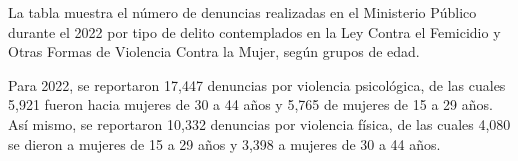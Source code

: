 \justifying La tabla muestra el número de denuncias realizadas en el Ministerio Público durante el 2022 por tipo de delito contemplados en la Ley Contra el Femicidio y Otras Formas de Violencia Contra la Mujer, según grupos de edad.

Para 2022, se reportaron 17,447 denuncias por violencia psicológica, de las cuales 5,921 fueron hacia mujeres de 30 a 44 años y 5,765 de mujeres de 15 a 29 años. Así mismo, se reportaron 10,332 denuncias por violencia física, de las cuales 4,080 se dieron a mujeres de 15 a 29 años y 3,398 a mujeres de 30 a 44 años. 